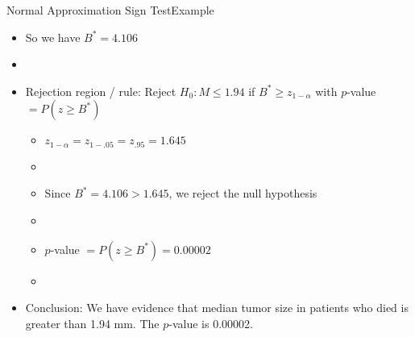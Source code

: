 \documentclass[xcolor=dvipsnames]{beamer}
\begin{document}
\begin{frame}{Normal Approximation Sign Test}{Example}
\begin{itemize}
	\item So we have $B^* = 4.106$ 
	\item[]
	\item Rejection region / rule: Reject $H_0: M \leq 1.94$ if $B^* \geq z_{1-\alpha}$ with $p$-value $=P(z \geq B^*)$
	\begin{itemize}
		\item $z_{1-\alpha} = z_{1-.05} = z_{.95} = 1.645$
		\item[]
		\item Since $B^* = 4.106 > 1.645$, we reject the null hypothesis
		\item[]
		\item $p$-value $=P(z \geq B^*) =  0.00002$
		\item[]
	\end{itemize}
	\item Conclusion: We have evidence that median tumor size in patients who died is greater than 1.94 mm. The $p$-value is 0.00002. 
\end{itemize}
\end{frame}
\end{document}
